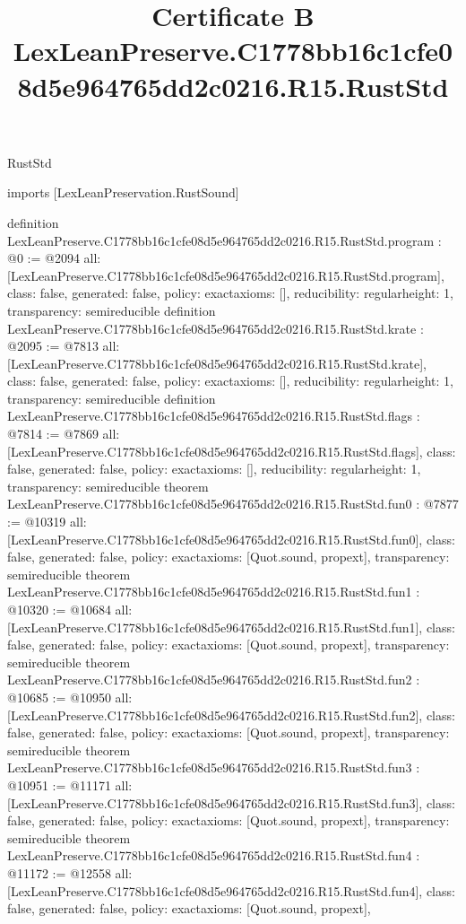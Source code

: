\begin{lexlean}{RustStd}
\title{Certificate B LexLeanPreserve.C1778bb16c1cfe08d5e964765dd2c0216.R15.RustStd}
\begin{coremodule}
imports [LexLeanPreservation.RustSound]

definition LexLeanPreserve.C1778bb16c1cfe08d5e964765dd2c0216.R15.RustStd.program : @0 := @2094 {
  all: [LexLeanPreserve.C1778bb16c1cfe08d5e964765dd2c0216.R15.RustStd.program],
  class: false,
  generated: false,
  policy: exact{axioms: []},
  reducibility: regular{height: 1},
  transparency: semireducible
}
definition LexLeanPreserve.C1778bb16c1cfe08d5e964765dd2c0216.R15.RustStd.krate : @2095 := @7813 {
  all: [LexLeanPreserve.C1778bb16c1cfe08d5e964765dd2c0216.R15.RustStd.krate],
  class: false,
  generated: false,
  policy: exact{axioms: []},
  reducibility: regular{height: 1},
  transparency: semireducible
}
definition LexLeanPreserve.C1778bb16c1cfe08d5e964765dd2c0216.R15.RustStd.flags : @7814 := @7869 {
  all: [LexLeanPreserve.C1778bb16c1cfe08d5e964765dd2c0216.R15.RustStd.flags],
  class: false,
  generated: false,
  policy: exact{axioms: []},
  reducibility: regular{height: 1},
  transparency: semireducible
}
theorem LexLeanPreserve.C1778bb16c1cfe08d5e964765dd2c0216.R15.RustStd.fun0 : @7877 := @10319 {
  all: [LexLeanPreserve.C1778bb16c1cfe08d5e964765dd2c0216.R15.RustStd.fun0],
  class: false,
  generated: false,
  policy: exact{axioms: [Quot.sound, propext]},
  transparency: semireducible
}
theorem LexLeanPreserve.C1778bb16c1cfe08d5e964765dd2c0216.R15.RustStd.fun1 : @10320 := @10684 {
  all: [LexLeanPreserve.C1778bb16c1cfe08d5e964765dd2c0216.R15.RustStd.fun1],
  class: false,
  generated: false,
  policy: exact{axioms: [Quot.sound, propext]},
  transparency: semireducible
}
theorem LexLeanPreserve.C1778bb16c1cfe08d5e964765dd2c0216.R15.RustStd.fun2 : @10685 := @10950 {
  all: [LexLeanPreserve.C1778bb16c1cfe08d5e964765dd2c0216.R15.RustStd.fun2],
  class: false,
  generated: false,
  policy: exact{axioms: [Quot.sound, propext]},
  transparency: semireducible
}
theorem LexLeanPreserve.C1778bb16c1cfe08d5e964765dd2c0216.R15.RustStd.fun3 : @10951 := @11171 {
  all: [LexLeanPreserve.C1778bb16c1cfe08d5e964765dd2c0216.R15.RustStd.fun3],
  class: false,
  generated: false,
  policy: exact{axioms: [Quot.sound, propext]},
  transparency: semireducible
}
theorem LexLeanPreserve.C1778bb16c1cfe08d5e964765dd2c0216.R15.RustStd.fun4 : @11172 := @12558 {
  all: [LexLeanPreserve.C1778bb16c1cfe08d5e964765dd2c0216.R15.RustStd.fun4],
  class: false,
  generated: false,
  policy: exact{axioms: [Quot.sound, propext]},
}
\end{coremodule}
\end{lexlean}
